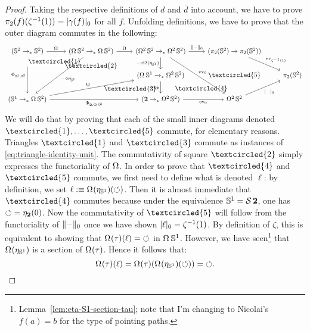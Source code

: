 \documentclass[english,a4]{article}
\newcommand{\ptdto}{\to_\ast}%
\newcommand{\setTrunc}[1]{\Trunc{#1}_0}
\newcommand{\settrunc}[1]{\trunc{#1}_0}
\begin{document}
\begin{proof}
  Taking the respective definitions of $d$ and $\bar d$ into account,
  we have to prove $\pi_2 (f)({\inv\zeta(1)})= \settrunc {\gamma(f)}$ for all $f$.
  Unfolding definitions, 
  we have to prove that the outer diagram commutes in the following:
  \begin{displaymath}
    \begin{tikzcd}
      (\Sp \ptdto \Sp) \ar[r,"\loopspace\null"] \ar[dd,"\Phi_{\Sc,\Sp}"{swap}]
      \drar[phantom,"\textcircled{\small 1}"{description, near start}] 
      & (\loopspace \null \Sp \ptdto \loopspace\null\Sp) \ar[r,"\loopspace\null"] \ar[ddl,"\blank\circ\eta_{\Sc}"] 
      \dar["\textcircled{\small 2}", phantom]
      & (\loopspace 2 \Sp \ptdto \loopspace 2 \Sp) \ar[ddr,"\ev_\ell"] 
      \ar[r,"\setTrunc\blank"] \dar["\blank\circ \loopspace\null(\eta_{\Sc})"swap] 
      & (\pi_2(\Sp) \to \pi_2(\Sp)) \drar["\ev_{\inv\zeta(1)}"] \ar[dd,"\textcircled{\small 5}", phantom] &
      \\
      & {} \drar["\textcircled{\small 3}"{near end}, phantom] 
      & (\loopspace\null\Sc \ptdto \loopspace 2 \Sp) \dar["\blank\circ\eta_{\bn 2}"swap] 
      \drar["\textcircled{\small 4}", phantom] &
      & \pi_2(\Sp)
      \\
      (\Sc \ptdto \loopspace\null\Sp) \ar[rr,"\Phi_{\bn 2,\loopspace\null\Sp}"swap] \ar[urr,"\loopspace\null"] & 
      & (\bn 2 \ptdto \loopspace 2 \Sp) \rar["\ev_0"swap] & \loopspace 2 \Sp \urar["\settrunc\blank"swap] & 
    \end{tikzcd}
  \end{displaymath}
  We will do that by proving that each of the small inner diagrams denoted
  $\textcircled{\small 1},\dots,\textcircled{\small 5}$ commute, for
  elementary reasons. Triangles $\textcircled{\small 1}$ and
  $\textcircled{\small 3}$ commute as instances of
  \cref{eq:triangle-identity-unit}. The commutativity of square
  $\textcircled{\small 2}$ simply expresses the functoriality of
  $\loopspace\null$. In order to prove that $\textcircled{\small 4}$ and
  $\textcircled{\small 5}$ commute, we first need to define what is denoted
  $\ell$: by definition, we set $\ell \defequi \loopspace\null (\eta_\Sc)(\Sloop)$.
  Then it is almost immediate that $\textcircled{\small 4}$ commutes because
  under the equivalence ${{\mathbb S^{1}}} = \operatorname{\mathcal S} {\mathbf{2}}$, one has $\mathord{\circlearrowleft} = \eta_{\mathbf{2}}(0)$.
  Now the commutativity of $\textcircled{\small 5}$ will follow from the
  functoriality of $\setTrunc\blank$ once we have shown $\settrunc \ell =
  \inv\zeta(1)$. By definition of $\zeta$, this is equivalent to showing that
  $\loopspace\null(\tau) (\ell) = \Sloop$ in $\loopspace\null \Sc$. However, we
  have seen\footnote{\color{red}Lemma~\ref{lem:eta-S1-section-tau};
note that I'm changing to Nicolai's $f(a)=b$ for the type of pointing paths.} 
that $\loopspace\null (\eta_\Sc)$ is a
  section of $\loopspace\null(\tau)$. Hence it follows that:
  \begin{displaymath}
    \loopspace\null(\tau)(\ell) = \loopspace\null(\tau)(\loopspace\null(\eta_\Sc)(\Sloop)) = \Sloop.
  \end{displaymath}
\end{proof}
\end{document}
